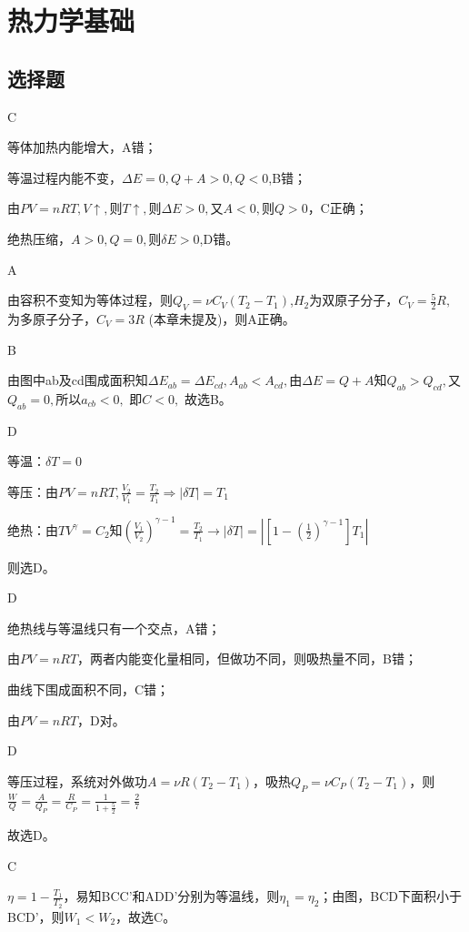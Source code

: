 \documentclass[b5paper,opensource]{./template/qyxf-book}
\begin{document}
\chapter{热力学基础}
\section{选择题}
C

\solve 
等体加热内能增大，A错；

等温过程内能不变，$\Delta E = 0,Q+A>0,Q<0$,B错；

由$PV=nRT,V \uparrow ,$则$ T \uparrow,$则$\Delta E > 0,$又$A<0,$则$Q>0$，C正确；

绝热压缩，$A>0,Q=0,$则$\delta E>0$,D错。

A

\solve 
由容积不变知为等体过程，则${Q_V} = \nu {C_V}({T_2} - {T_1})$,$H_2$为双原子分子，${C_V} = \frac{5}{2}R,$ 为多原子分子，$C_V=3R$ (本章未提及)，则A正确。


B

\solve 由图中ab及cd围成面积知$\Delta {E_{ab}} = \Delta {E_{cd}},A_{ab} < {A_{cd}},$由$\Delta E = Q + A$知$Q_{ab} > {Q_{cd}},$又${Q_{ab}} = 0,$所以${a_{cb}} < 0,$  即$C < 0,$ 故选B。


D

\solve 等温：$\delta T=0$

等压：由$PV=nRT,\frac{V_2}{V_1}=\frac{T_2}{T_1} \Rightarrow |\delta T|=T_1$

绝热：由$TV^\gamma=C_2$知$(\frac{V_1}{V_2})^{\gamma-1}=\frac{T_2}{T_1}\rightarrow |\delta T|=|[1-(\frac{1}{2})^{\gamma-1}]T_1|$

则选D。

D

\solve 绝热线与等温线只有一个交点，A错；

由$PV=nRT$，两者内能变化量相同，但做功不同，则吸热量不同，B错；

曲线下围成面积不同，C错；

由$PV=nRT$，D对。

D

\solve 等压过程，系统对外做功$A=\nu R(T_2-T_1)$，吸热$Q_P=\nu C_P(T_2-T_1)$，则$\frac{W}{Q}=\frac{A}{Q_P}=\frac{R}{C_P}=\frac{1}{1+\frac{5}{2}}=\frac{2}{7}$

故选D。

C

\solve $\eta=1-\frac{T_1}{T_2}$，易知BCC'和ADD'分别为等温线，则$\eta_1=\eta_2$；由图，BCD下面积小于BCD'，则$W_1<W_2$，故选C。
\end{document}
